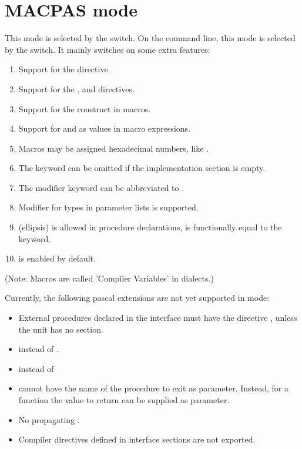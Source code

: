 \section{MACPAS mode}
This mode is selected by the  switch. On the
command line, this mode is selected by the  switch. It mainly
switches on some extra features:
\begin{enumerate}
\item Support for the  directive.
\item Support for the ,  and 
directives.
\item Support for the  construct in macros.
\item Support for  and  as values in macro expressions.
\item Macros may be assigned hexadecimal numbers, like .
\item The  keyword can be omitted if the implementation
section is empty.
\item The  modifier keyword can be abbreviated to .
\item {} Modifier for types in parameter lists is supported.
\item {} (ellipsis) is allowed in procedure declarations, is
functionally equal to the  keyword.
\item {} is enabled by default.
\end{enumerate}
(Note: Macros are called 'Compiler Variables' in \macos dialects.)

Currently, the following \macos pascal extensions are not yet supported in
 mode:
\begin{itemize}
\item External procedures declared in the interface must have the directive , unless the unit has no  section.
\item {} instead of .
\item {} instead of 
\item {} cannot have the name of the procedure to exit as parameter.
Instead, for a function the value to return can be supplied as parameter. 
\item No propagating .
\item Compiler directives defined in interface sections are not exported.
\end{itemize}

